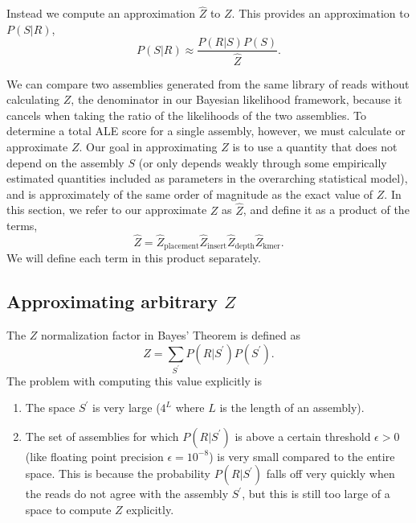 \documentclass[phd,tocprelim]{cornell}
\begin{document}
Instead we compute an approximation $\hat{Z}$ to $Z$.  This provides an approximation to $P(S|R)$,
\begin{equation}
    P(S|R) \approx \frac{P(R|S)P(S)}{\hat{Z}}.
\end{equation}

We can compare two assemblies generated from the same library of reads without calculating $Z$, the denominator in our Bayesian likelihood framework, because it cancels when taking the ratio of the likelihoods of the two assemblies. To determine a total ALE score for a single assembly, however, we must calculate or approximate $Z$. Our goal in approximating $Z$ is to use a quantity that does not depend on the assembly $S$ (or only depends weakly through some empirically estimated quantities included as parameters in the overarching statistical model), and is approximately of the same order of magnitude as the exact value of $Z$.  In this section, we refer to our approximate $Z$ as $\hat{Z}$, and define it as a product of the terms,
\begin{equation}
    \hat{Z} = \hat{Z}_{\text{placement}}\hat{Z}_{\text{insert}}\hat{Z}_{\text{depth}}\hat{Z}_{\text{kmer}}.
\end{equation}
We will define each term in this product separately.

\subsection{Approximating arbitrary $Z$}
\label{arbZ}

The $Z$ normalization factor in Bayes' Theorem is defined as
\begin{equation}
    Z = \sum_{S^{\prime}}P(R|S^{\prime})P(S^{\prime}).
\end{equation}
The problem with computing this value explicitly is 
\begin{enumerate}
    \item The space $S^{\prime}$ is very large ($4^{L}$ where $L$ is the length of an assembly).
    \item The set of assemblies for which $P(R|S^{\prime})$ is above a certain threshold $\epsilon > 0$ (like floating point precision $\epsilon = 10^{-8}$) is very small compared to the entire space. This is because the probability $P(R|S^{\prime})$ falls off very quickly when the reads do not agree with the assembly $S^{\prime}$, but this is still too large of a space to compute $Z$ explicitly.
\end{enumerate}
\end{document}
